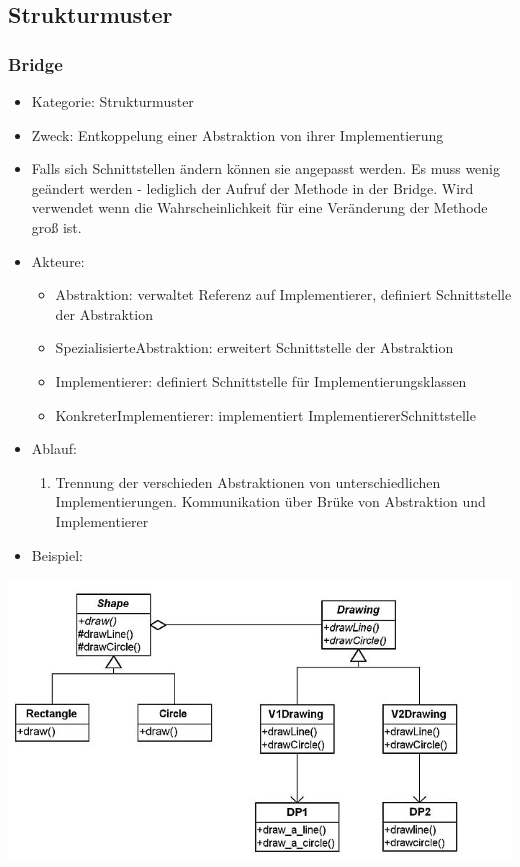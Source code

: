 \documentclass[11pt, fleqn, a4paper, leqno]{scrartcl} %
\begin{document}
		\subsection{Strukturmuster}
		\subsubsection{Bridge}
			\begin{itemize}
				\item Kategorie: Strukturmuster
				\item Zweck: Entkoppelung einer Abstraktion von ihrer Implementierung
				\item Falls sich Schnittstellen ändern können sie angepasst werden. Es muss wenig geändert werden - lediglich der Aufruf der Methode in der Bridge. Wird verwendet wenn die Wahrscheinlichkeit für eine Veränderung der Methode groß ist.
				\item Akteure: 
				\begin{itemize}
					\item Abstraktion: verwaltet Referenz auf Implementierer, definiert Schnittstelle der Abstraktion
					\item SpezialisierteAbstraktion: erweitert Schnittstelle der Abstraktion
					\item Implementierer: definiert Schnittstelle für Implementierungsklassen
					\item KonkreterImplementierer: implementiert ImplementiererSchnittstelle
				\end{itemize}
				\item Ablauf:
				\begin{enumerate}
					\item Trennung der verschieden Abstraktionen von unterschiedlichen Implementierungen. Kommunikation über Brüke von Abstraktion und Implementierer
				\end{enumerate}
				\item Beispiel:			
			\end{itemize}
			\includegraphics[scale=0.4]{images/bridge-example.jpg}\\
\end{document}

